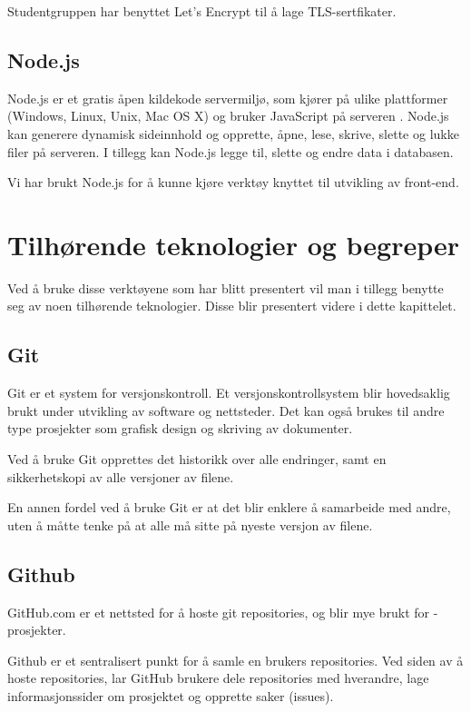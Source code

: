Studentgruppen har benyttet Let's Encrypt til å lage TLS-sertfikater.

\subsection{Node.js}
Node.js er et gratis åpen kildekode servermiljø, som kjører på ulike plattformer (Windows, Linux, Unix, Mac OS X) og bruker JavaScript på serveren \cite{w3schools2019win}. Node.js kan generere dynamisk sideinnhold og opprette, åpne, lese, skrive, slette og lukke filer på serveren. I tillegg kan Node.js legge til, slette og endre data i databasen.

Vi har brukt Node.js for å kunne kjøre verktøy knyttet til utvikling av front-end.

\section{Tilhørende teknologier og begreper}
Ved å bruke disse verktøyene som har blitt presentert vil man i tillegg benytte seg av noen tilhørende teknologier. Disse blir presentert videre i dette kapittelet. 

\subsection{Git}
Git \cite{TechTarget} er et system for versjonskontroll. Et versjonskontrollsystem blir hovedsaklig brukt under utvikling av software og nettsteder. Det kan også brukes til andre type prosjekter som grafisk design og skriving av dokumenter.

Ved å bruke Git opprettes det historikk over alle endringer, samt en sikkerhetskopi av alle versjoner av filene.

En annen fordel ved å bruke Git er at det blir enklere å samarbeide med andre, uten å måtte tenke på at alle må sitte på nyeste versjon av filene.

\subsection{Github}
GitHub.com er et nettsted for å hoste git repositories, og blir mye brukt for -prosjekter. 

Github \cite{TechTarget} er et sentralisert punkt for å samle en brukers repositories. Ved siden av å hoste repositories, lar GitHub brukere dele repositories med hverandre, lage informasjonssider om prosjektet og opprette saker (issues).

